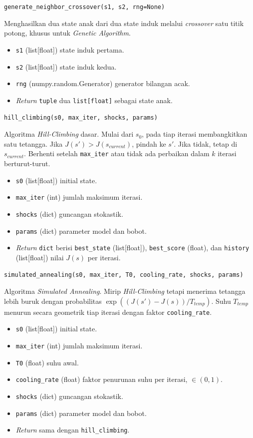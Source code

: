 \texttt{generate\_neighbor\_crossover(s1, s2, rng=None)}

Menghasilkan dua state anak dari dua state induk melalui \textit{crossover} satu titik potong, khusus untuk \textit{Genetic Algorithm}.

\begin{itemize}
    \item \texttt{s1} (list[float]) state induk pertama.
    \item \texttt{s2} (list[float]) state induk kedua.
    \item \texttt{rng} (numpy.random.Generator) generator bilangan acak.
    \item \textit{Return} \texttt{tuple} dua \texttt{list[float]} sebagai state anak.
\end{itemize}

\texttt{hill\_climbing(s0, max\_iter, shocks, params)}

Algoritma \textit{Hill-Climbing} dasar. Mulai dari $s_0$, pada tiap iterasi membangkitkan satu tetangga. Jika $J(s') > J(s_{current})$, pindah ke $s'$. Jika tidak, tetap di $s_{current}$. Berhenti setelah \texttt{max\_iter} atau tidak ada perbaikan dalam $k$ iterasi berturut-turut.

\begin{itemize}
    \item \texttt{s0} (list[float]) initial state.
    \item \texttt{max\_iter} (int) jumlah maksimum iterasi.
    \item \texttt{shocks} (dict) guncangan stokastik.
    \item \texttt{params} (dict) parameter model dan bobot.
    \item \textit{Return} \texttt{dict} berisi \texttt{best\_state} (list[float]), \texttt{best\_score} (float), dan \texttt{history} (list[float]) nilai $J(s)$ per iterasi.
\end{itemize}

\texttt{simulated\_annealing(s0, max\_iter, T0, cooling\_rate, shocks, params)}

Algoritma \textit{Simulated Annealing}. Mirip \textit{Hill-Climbing} tetapi menerima tetangga lebih buruk dengan probabilitas $\exp((J(s') - J(s)) / T_{temp})$. Suhu $T_{temp}$ menurun secara geometrik tiap iterasi dengan faktor \texttt{cooling\_rate}.

\begin{itemize}
    \item \texttt{s0} (list[float]) initial state.
    \item \texttt{max\_iter} (int) jumlah maksimum iterasi.
    \item \texttt{T0} (float) suhu awal.
    \item \texttt{cooling\_rate} (float) faktor penurunan suhu per iterasi, $\in (0, 1)$.
    \item \texttt{shocks} (dict) guncangan stokastik.
    \item \texttt{params} (dict) parameter model dan bobot.
    \item \textit{Return} sama dengan \texttt{hill\_climbing}.
\end{itemize}

